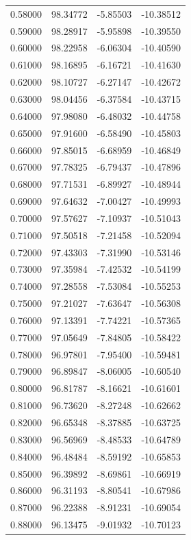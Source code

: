 \begin{table}
\begin{tabular}{llll}
0.58000 & 98.34772 & -5.85503 & -10.38512 \\
0.59000 & 98.28917 & -5.95898 & -10.39550 \\
0.60000 & 98.22958 & -6.06304 & -10.40590 \\
0.61000 & 98.16895 & -6.16721 & -10.41630 \\
0.62000 & 98.10727 & -6.27147 & -10.42672 \\
0.63000 & 98.04456 & -6.37584 & -10.43715 \\
0.64000 & 97.98080 & -6.48032 & -10.44758 \\
0.65000 & 97.91600 & -6.58490 & -10.45803 \\
0.66000 & 97.85015 & -6.68959 & -10.46849 \\
0.67000 & 97.78325 & -6.79437 & -10.47896 \\
0.68000 & 97.71531 & -6.89927 & -10.48944 \\
0.69000 & 97.64632 & -7.00427 & -10.49993 \\
0.70000 & 97.57627 & -7.10937 & -10.51043 \\
0.71000 & 97.50518 & -7.21458 & -10.52094 \\
0.72000 & 97.43303 & -7.31990 & -10.53146 \\
0.73000 & 97.35984 & -7.42532 & -10.54199 \\
0.74000 & 97.28558 & -7.53084 & -10.55253 \\
0.75000 & 97.21027 & -7.63647 & -10.56308 \\
0.76000 & 97.13391 & -7.74221 & -10.57365 \\
0.77000 & 97.05649 & -7.84805 & -10.58422 \\
0.78000 & 96.97801 & -7.95400 & -10.59481 \\
0.79000 & 96.89847 & -8.06005 & -10.60540 \\
0.80000 & 96.81787 & -8.16621 & -10.61601 \\
0.81000 & 96.73620 & -8.27248 & -10.62662 \\
0.82000 & 96.65348 & -8.37885 & -10.63725 \\
0.83000 & 96.56969 & -8.48533 & -10.64789 \\
0.84000 & 96.48484 & -8.59192 & -10.65853 \\
0.85000 & 96.39892 & -8.69861 & -10.66919 \\
0.86000 & 96.31193 & -8.80541 & -10.67986 \\
0.87000 & 96.22388 & -8.91231 & -10.69054 \\
0.88000 & 96.13475 & -9.01932 & -10.70123 \\

\end{tabular}
\end{table}
